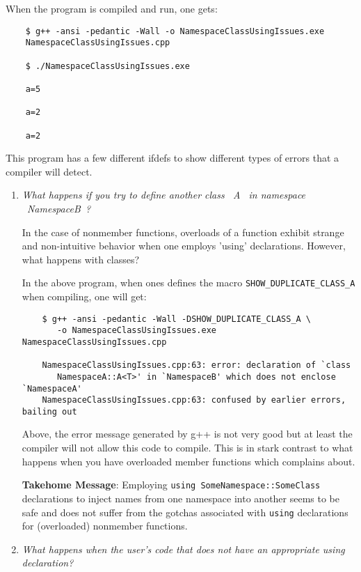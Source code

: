 When the program is compiled and run, one gets:

{\small\begin{verbatim}
    $ g++ -ansi -pedantic -Wall -o NamespaceClassUsingIssues.exe
    NamespaceClassUsingIssues.cpp
    
    $ ./NamespaceClassUsingIssues.exe 
    
    a=5
    
    a=2
    
    a=2
\end{verbatim}}

This program has a few different ifdefs to show different types of errors that
a compiler will detect.

\begin{enumerate}

{}\item\textit{What happens if you try to define another class ~A~ in
namespace ~NamespaceB~?}

In the case of nonmember functions, overloads of a function exhibit strange
and non-intuitive behavior when one employs 'using' declarations.  However,
what happens with classes?

In the above program, when ones defines the macro
{}\texttt{SHOW\-\_DUPLICATE\-\_CLASS\-\_A} when compiling, one will get:

{\small\begin{verbatim}
    $ g++ -ansi -pedantic -Wall -DSHOW_DUPLICATE_CLASS_A \
       -o NamespaceClassUsingIssues.exe NamespaceClassUsingIssues.cpp             

    NamespaceClassUsingIssues.cpp:63: error: declaration of `class 
       NamespaceA::A<T>' in `NamespaceB' which does not enclose `NamespaceA'
    NamespaceClassUsingIssues.cpp:63: confused by earlier errors, bailing out
\end{verbatim}}

Above, the error message generated by g++ is not very good but at least the
compiler will not allow this code to compile.  This is in stark contrast to
what happens when you have overloaded member functions which {}\cite[Item
59]{C++CodingStandards05} complains about.

{}\textbf{Takehome Message}: Employing {}\texttt{using
SomeNamespace::SomeClass} declarations to inject names from one namespace into
another seems to be safe and does not suffer from the gotchas associated with
{}\texttt{using} declarations for (overloaded) nonmember functions.

{}\item\textit{What happens when the user's code that does not have an
appropriate using declaration?}


\end{enumerate}
